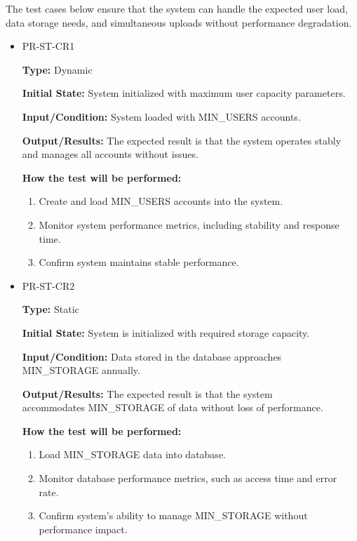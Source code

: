 \documentclass[12pt, titlepage]{article}
\begin{document}
\hspace{2em}The test cases below ensure that the system can handle the expected user load, 
data storage needs, and simultaneous uploads without performance degradation. 

\begin{itemize}
  \item PR-ST-CR1
  \begin{mdframed}[linewidth=0.5mm]
      \textbf{Type:} Dynamic \par
      \textbf{Initial State:} System initialized with maximum user capacity parameters. \par
      \textbf{Input/Condition:} System loaded with MIN\_USERS accounts. \par
      \textbf{Output/Results:} The expected result is that the system operates stably and manages all accounts without issues. \par
      \textbf{How the test will be performed:}
      \begin{enumerate}[noitemsep]
        \item Create and load MIN\_USERS accounts into the system.
        \item Monitor system performance metrics, including stability and response time.
        \item Confirm system maintains stable performance.
      \end{enumerate}
  \end{mdframed}
  \item PR-ST-CR2
  \begin{mdframed}[linewidth=0.5mm]
      \textbf{Type:} Static \par
      \textbf{Initial State:} System is initialized with required storage capacity. \par
      \textbf{Input/Condition:} Data stored in the database approaches MIN\_STORAGE annually. \par
      \textbf{Output/Results:} The expected result is that the system \\accommodates MIN\_STORAGE of data without loss of performance. \par
      \textbf{How the test will be performed:}
      \begin{enumerate}[noitemsep]
        \item Load MIN\_STORAGE data into database.
        \item Monitor database performance metrics, such as access time and error rate.
        \item Confirm system’s ability to manage MIN\_STORAGE without performance impact.
      \end{enumerate}
  \end{mdframed}
\end{itemize}
\end{document}
